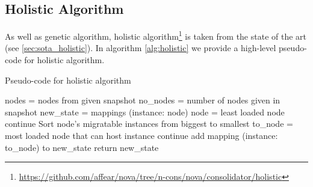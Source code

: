 \subsection{Holistic Algorithm}
\label{sub:algs_rnd}
As well as genetic algorithm, holistic algorithm\footnote{\url{https://github.com/affear/nova/tree/n-cons/nova/consolidator/holistic}} is taken from the state of the art (see \ref{sec:sota_holistic}). In algorithm \ref{alg:holistic} we provide a high-level pseudo-code for holistic algorithm.

\begin{algorithm}[H]
\caption{Pseudo-code for holistic algorithm}
\label{alg:holistic}
\begin{algorithmic}[0]
	\State nodes = nodes from given snapshot
	\State no\_nodes = number of nodes given in snapshot
	\State new\_state = mappings (instance: node)
	\State
		\State node = least loaded node
		\State
			\State continue
		\EndIf
		\State
		\State Sort node's migratable instances from biggest to smallest
		\State
			\State to\_node = most loaded node that can host instance
				\State continue
			\EndIf
			\State add mapping (instance: to\_node) to new\_state
		\EndFor
	\EndFor
	\State
	\State return new\_state
\end{algorithmic}
\end{algorithm}